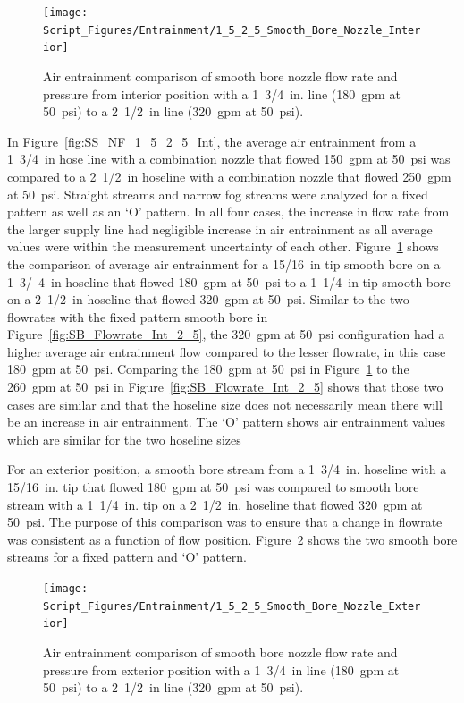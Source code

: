 \documentclass[12pt,oneside]{book}
\begin{document}
\begin{figure}[!ht]
\centering
\texttt{[image: Script\_Figures/Entrainment/1\_5\_2\_5\_Smooth\_Bore\_Nozzle\_Interior]}
\caption[Air Entrainment Comparison of Interior Smooth Bore Nozzle from 1~3/4~in Line to 2~1/2~in. Line]{Air entrainment comparison of smooth bore nozzle flow rate and pressure from interior position with a 1~3/4~in. line (180~gpm at 50~psi) to a 2~1/2~in line (320~gpm at 50~psi).}
\label{fig:SB_1_5_2_5_Int}
\end{figure}

In Figure~\ref{fig:SS_NF_1_5_2_5_Int}, the average air entrainment from a 1~3/4~in hose line with a combination nozzle that flowed 150~gpm at 50~psi was compared to a 2~1/2~in hoseline with a combination nozzle that flowed 250~gpm at 50~psi. Straight streams and narrow fog streams were analyzed for a fixed pattern as well as an `O' pattern. In all four cases, the increase in flow rate from the larger supply line had negligible increase in air entrainment as all average values were within the measurement uncertainty of each other. Figure~\ref{fig:SB_1_5_2_5_Int} shows the comparison of average air entrainment for a 15/16~in tip smooth bore on a 1~3/~4~in hoseline that flowed 180~gpm at 50~psi to a 1~1/4~in tip smooth bore on a 2~1/2~in hoseline that flowed 320~gpm at 50~psi. Similar to the two flowrates with the fixed pattern smooth bore in Figure~\ref{fig:SB_Flowrate_Int_2_5}, the 320~gpm at 50~psi configuration had a higher average air entrainment flow compared to the lesser flowrate, in this case 180~gpm at 50~psi. Comparing the 180~gpm at 50~psi in Figure~\ref{fig:SB_1_5_2_5_Int} to the 260~gpm at 50~psi in Figure~\ref{fig:SB_Flowrate_Int_2_5} shows that those two cases are similar and that the hoseline size does not necessarily mean there will be an increase in air entrainment. The `O' pattern shows air entrainment values which are similar for the two hoseline sizes

For an exterior position, a smooth bore stream from a 1~3/4~in. hoseline with a 15/16~in. tip that flowed 180~gpm at 50~psi was compared to smooth bore stream with a 1~1/4~in. tip on a 2~1/2~in. hoseline that flowed 320~gpm at 50~psi. The purpose of this comparison was to ensure that a change in flowrate was consistent as a function of flow position. Figure~\ref{fig:SB_Flowrate_Hoseline_Exterior} shows the two smooth bore streams for a fixed pattern and `O' pattern.

\begin{figure}[!ht]
\centering
\texttt{[image: Script\_Figures/Entrainment/1\_5\_2\_5\_Smooth\_Bore\_Nozzle\_Exterior]}
\caption[Air Entrainment Comparison of Exterior Smooth Bore Nozzle from 1~3/4~in Line to 2~1/2~in Line]{Air entrainment comparison of smooth bore nozzle flow rate and pressure from exterior position with a 1~3/4~in line (180~gpm at 50~psi) to a 2~1/2~in line (320~gpm at 50~psi).}
\label{fig:SB_Flowrate_Hoseline_Exterior}
\end{figure}
\end{document}
